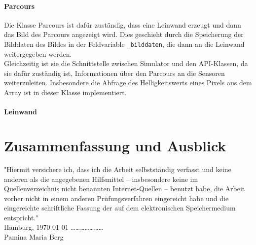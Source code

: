 \documentclass[paper=a4, pagesize, DIV=calc, BCOR=12.5mm, twoside=on, onecolumn=on, open = any, titlepage =on, parskip =half-, headsepline = on, footsepline = on, chapterprefix = on, appendixprefix = off, fontsize = 12pt, numbers = noenddot, abstract = on]{scrbook}
\numberwithin{equation}{chapter}
\theoremstyle{definition}
\theoremstyle{plain}
\theoremstyle{plain}
\theoremstyle{remark}
\theoremstyle{plain}
\theoremstyle{plain}
\begin{document}
\subsubsection{Parcours}
Die Klasse Parcours ist dafür zuständig, dass eine Leinwand erzeugt und dann das Bild des Parcours angezeigt wird. Dies geschieht durch die Speicherung der Bilddaten des Bildes in der Feldvariable \texttt{{\_}bilddaten}, die dann an die Leinwand weitergegeben werden.\\

Gleichzeitig ist sie die Schnittstelle zwischen Simulator und den API-Klassen, da sie dafür zuständig ist, Informationen über den Parcours an die Sensoren weiterzuleiten. Insbesondere die Abfrage des Helligkeitswerts eines Pixels aus dem Array ist in dieser Klasse implementiert.
\subsubsection{Leinwand}

\newpage
\chapter{Zusammenfassung und Ausblick}

\newpage

\newpage
\thispagestyle{empty}
\vspace*{\fill}
"Hiermit versichere ich, dass ich die Arbeit selbstständig verfasst und keine anderen als die angegebenen Hilfsmittel – insbesondere keine im Quellenverzeichnis nicht benannten Internet-Quellen – benutzt habe, die Arbeit vorher nicht in einem anderen Prüfungsverfahren eingereicht habe und die eingereichte schriftliche Fassung der auf dem elektronischen Speichermedium entspricht."\\

Hamburg, \today \hspace*{\fill} \dots \dots \dots \dots \dots \dots \dots\\
\hspace*{\fill} Pamina Maria Berg $\,$
\end{document}
